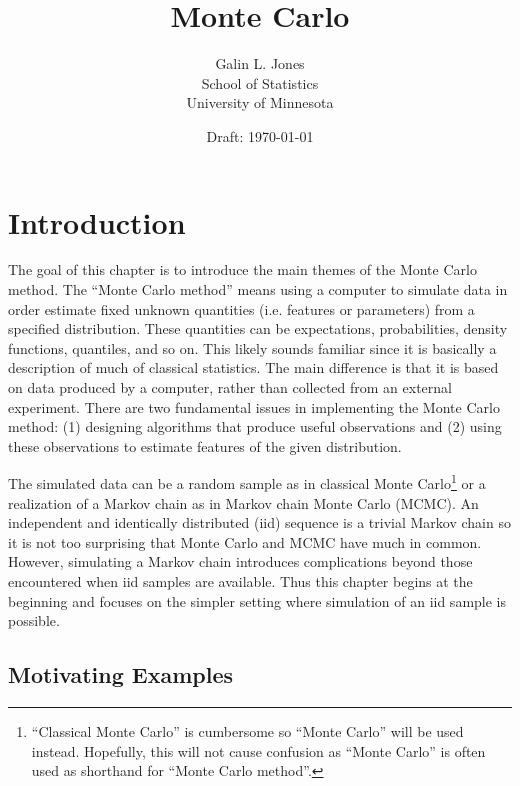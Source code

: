 \documentclass[12pt]{article}
\title{Monte Carlo}
\author{Galin L. Jones\\
{\small School of Statistics}\\
{\small University of Minnesota}}
\date{Draft: \today}
\theoremstyle{plain}
\theoremstyle{definition}
\theoremstyle{remark}
\begin{document}
\maketitle

\tableofcontents

\section{Introduction}
\label{gofmc:sec:intro}

The goal of this chapter is to introduce the main themes of the Monte Carlo 
method.  The ``Monte Carlo method'' means using a computer to
simulate data in order estimate fixed unknown quantities
(i.e. features or parameters) from a specified distribution.  These
quantities can be expectations, probabilities, density functions,
quantiles, and so on. This likely sounds familiar since it is
basically a description of much of classical statistics.  The main
difference is that it is based on data produced by a computer,
rather than collected from an external experiment.  There are two
fundamental issues in implementing the Monte Carlo method: (1)
designing algorithms that produce useful observations and (2) using
these observations to estimate features of the given distribution.

The simulated data can be a random sample as in classical Monte
Carlo\footnote{``Classical Monte Carlo'' is cumbersome so
  ``Monte Carlo'' will be used instead.  Hopefully, this will not
  cause confusion as ``Monte Carlo'' is often used as shorthand for
  ``Monte Carlo method''.} or a realization of a Markov chain as in
Markov chain Monte Carlo (MCMC).  An independent and identically
distributed (iid) sequence is a trivial Markov chain so it is not too
surprising that Monte Carlo and MCMC have much in common.  However,
simulating a Markov chain introduces complications beyond those
encountered when iid samples are available.  Thus this chapter begins
at the beginning and focuses on the simpler setting where simulation
of an iid sample is possible.

\subsection{Motivating Examples}
\label{gofmc:sec:motivating_examples}
\end{document}
